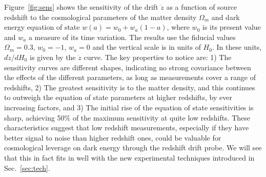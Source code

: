 \documentclass[preprint2, 10pt]{aastex}
\newcommand{\om}{\Omega_m}
\begin{document}
Figure~\ref{fig:sens} shows the sensitivity of the drift $\dot z$ as a 
function of source redshift to the cosmological parameters of the matter 
density $\om$ and dark energy equation of state $w(a)=w_0+w_a(1-a)$, where 
$w_0$ is its present value and $w_a$ a measure of its time variation.
The results use the fiducial values $\om=0.3$, $w_0=-1$, $w_a=0$ and the 
vertical scale is in units of $H_0$.  In these units, $d\dot z/dH_0$ is 
given by the $\dot z$ curve. The key properties to notice are: 
1) The sensitivity curves are different 
shapes, indicating no strong covariance between the effects of the different 
parameters, as long as measurements cover a range of redshifts, 
2) The greatest sensitivity is to the matter density, and this 
continues to outweigh the equation of state parameters at higher redshifts, 
by ever increasing factors, and 3) The initial rise of the equation of 
state sensitivities is sharp, achieving 50\% of the maximum sensitivity 
at quite low redshifts. These characteristics suggest that low redshift 
measurements, especially if they have better signal to noise than higher 
redshift ones, could be valuable for cosmological leverage on dark energy 
through the redshift drift probe. We will see that this in fact fits in 
well with the new experimental techniques introduced in Sec.~\ref{sec:tech}. 
\end{document}
